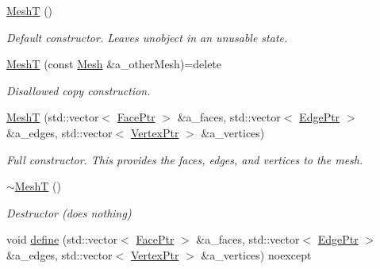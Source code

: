 \begin{DoxyCompactItemize}
\item 
\mbox{\label{classDcel_1_1MeshT_a4eae06529761d8aff54e945eb0a3ba91}} 
\hyperlink{classDcel_1_1MeshT_a4eae06529761d8aff54e945eb0a3ba91}{MeshT} ()
\begin{DoxyCompactList}\small\item\em Default constructor. Leaves unobject in an unusable state. \end{DoxyCompactList}\item 
\hyperlink{classDcel_1_1MeshT_aa055e10c62778ba629b3f9c849338e03}{MeshT} (const \hyperlink{classDcel_1_1MeshT_abe9db973f4510ccb36e20ecfa9223926}{Mesh} \&a\+\_\+other\+Mesh)=delete
\begin{DoxyCompactList}\small\item\em Disallowed copy construction. \end{DoxyCompactList}\item 
\hyperlink{classDcel_1_1MeshT_a7468e3630893d64a71a7c2347496576b}{MeshT} (std\+::vector$<$ \hyperlink{classDcel_1_1MeshT_a6c71642a9e6b36f9d6ab6027035625f0}{Face\+Ptr} $>$ \&a\+\_\+faces, std\+::vector$<$ \hyperlink{classDcel_1_1MeshT_ab2b035530536a8bc56e40aab455f24e3}{Edge\+Ptr} $>$ \&a\+\_\+edges, std\+::vector$<$ \hyperlink{classDcel_1_1MeshT_a1e0abeadcb51e679b0dd9a36e2ee08c7}{Vertex\+Ptr} $>$ \&a\+\_\+vertices)
\begin{DoxyCompactList}\small\item\em Full constructor. This provides the faces, edges, and vertices to the mesh. \end{DoxyCompactList}\item 
\mbox{\label{classDcel_1_1MeshT_a51da8ad54b3cfe69a695221f73bd97b2}} 
\hyperlink{classDcel_1_1MeshT_a51da8ad54b3cfe69a695221f73bd97b2}{$\sim$\+MeshT} ()
\begin{DoxyCompactList}\small\item\em Destructor (does nothing) \end{DoxyCompactList}\item 
void \hyperlink{classDcel_1_1MeshT_af65f5fc459d586ba3b6bd0711b0951f5}{define} (std\+::vector$<$ \hyperlink{classDcel_1_1MeshT_a6c71642a9e6b36f9d6ab6027035625f0}{Face\+Ptr} $>$ \&a\+\_\+faces, std\+::vector$<$ \hyperlink{classDcel_1_1MeshT_ab2b035530536a8bc56e40aab455f24e3}{Edge\+Ptr} $>$ \&a\+\_\+edges, std\+::vector$<$ \hyperlink{classDcel_1_1MeshT_a1e0abeadcb51e679b0dd9a36e2ee08c7}{Vertex\+Ptr} $>$ \&a\+\_\+vertices) noexcept

\end{DoxyCompactItemize}
